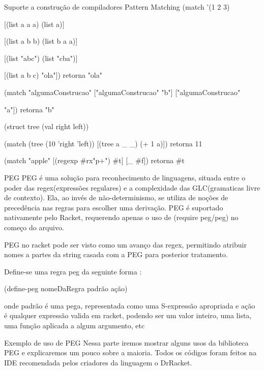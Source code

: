 \documentclass{beamer}
\begin{document}
\begin{frame}[fragile]{Suporte a construção de compiladores}
Pattern Matching
(match '(1 2 3)
 
      [(list a a a) (list a)]
      
      [(list a b b) (list b a a)]
      
      [(list "abc") (list "cba")]
      
      [(list a b c) "ola"]) retorna "ola"
      
 (match "algumaConstrucao" ["algumaConstrucao" "b"] ["algumaConstrucao" 
 
 "a"]) retorna "b"
 
 (struct tree (val right left))
 
 (match (tree (10 'right 'left)) [(tree a \_ \_) (+ 1 a)]) retorna 11
 
 (match "apple" [(regexp \#rx"p+") \#t] [\_ \#f])  retorna \#t
\end{frame}


\begin{frame}{PEG}
PEG é uma solução para reconhecimento de linguagens, situada entre o poder das regex(expressões regulares) e a complexidade das GLC(gramaticas livre de 
contexto). Ela, ao invés de não-determinismo, se utiliza de noções de precedência nas regras para escolher uma derivação.
PEG é suportado nativamente pelo Racket, requerendo apenas o uso de (require peg/peg) no começo do arquivo.

PEG no racket pode ser visto como um avanço das regex, permitindo atribuir nomes a partes da string casada com a PEG para posterior tratamento.

Define-se uma regra peg da seguinte forma :

(define-peg nomeDaRegra padrão ação)

onde padrão é uma pega, representada como uma S-expressão apropriada e ação é qualquer expressão valida em racket, podendo ser um valor inteiro, uma lista, uma função aplicada a algum argumento, etc

\end{frame}


\begin{frame}{Exemplo de uso de PEG}
Nessa parte iremos mostrar alguns usos da biblioteca PEG e explicaremos um pouco sobre a maioria.
Todos os códigos foram feitos na IDE recomendada pelos criadores da linguagem o DrRacket.
\end{frame}
\end{document}
